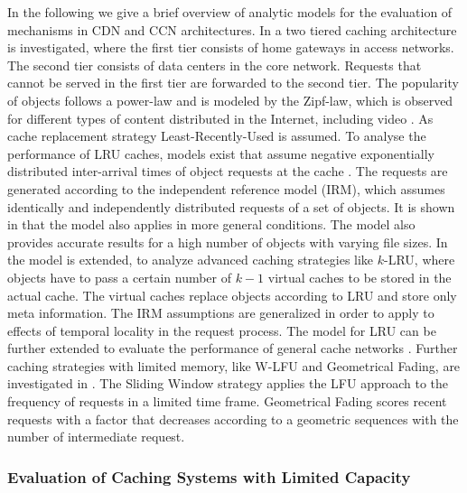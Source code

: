 In the following we give a brief overview of analytic models for the evaluation of mechanisms in CDN and CCN architectures.
In \cite{fricker2012impact} a two tiered caching architecture is investigated, where the first tier consists of home gateways in access networks.
The second tier consists of data centers in the core network.
Requests that cannot be served in the first tier are forwarded to the second tier.
The popularity of objects follows a power-law and is modeled by the Zipf-law, which is observed for different types of content distributed in the Internet, including video \cite{gill2007youtube,cha2009analyzing}.
As cache replacement strategy Least-Recently-Used is assumed.
To analyse the performance of LRU caches, models exist that assume negative exponentially distributed inter-arrival times of object requests at the cache \cite{che2002hierarchical}.
The requests are generated according to the independent reference model (IRM), which assumes identically and independently distributed requests of a set of objects.
It is shown in \cite{fricker2012versatile} that the model also applies in more general conditions.
The model also provides accurate results for a high number of objects with varying file sizes.
In \cite{martina2014unified} the model is extended, to analyze advanced caching strategies like {$k$-LRU}, where objects have to pass a certain number of $k-1$ virtual caches to be stored in the actual cache.
The virtual caches replace objects according to LRU and store only meta information.
The IRM assumptions are generalized in order to apply to effects of temporal locality in the request process.
The model for LRU can be further extended to evaluate the performance of general cache networks \cite{rosensweig2010approximate, martina2014unified}.
Further caching strategies with limited memory, like W-LFU and Geometrical Fading, are investigated in \cite{hasslinger2014caching}.
The Sliding Window strategy applies the LFU approach to the frequency of requests in a limited time frame.
Geometrical Fading scores recent requests with a factor that decreases according to a geometric sequences with the number of intermediate request.

\subsubsection{Evaluation of Caching Systems with Limited Capacity}

